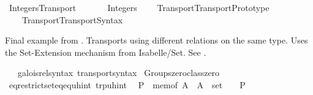 %
\begin{isabellebody}%
%
%
\isadelimdocument
%
\endisadelimdocument
%
\isatagdocument
%
\isamarkuptrue%
%
\endisatagdocument
{\isafolddocument}%
%
\isadelimdocument
%
\endisadelimdocument
%
\isadelimtheory
%
\endisadelimtheory
%
\isatagtheory
{}\isamarkupfalse%
\ Integers{\isacharunderscore}{\kern0pt}Transport\isanewline
\ \ \isanewline
\ \ \ \ Integers\isanewline
\ \ \ \ Transport{\isachardot}{\kern0pt}Transport{\isacharunderscore}{\kern0pt}Prototype\isanewline
\ \ \ \ Transport{\isachardot}{\kern0pt}Transport{\isacharunderscore}{\kern0pt}Syntax\isanewline
{}%
\endisatagtheory
{\isafoldtheory}%
%
\isadelimtheory
%
\endisadelimtheory
%
\isadelimdocument
%
\endisadelimdocument
%
\isatagdocument
%
\isamarkuptrue%
%
\endisatagdocument
{\isafolddocument}%
%
\isadelimdocument
%
\endisadelimdocument
%
\begin{isamarkuptext}%
Final example from \cite{transport}. Transports using different
relations on the same type. Uses the Set-Extension mechanism from Isabelle/Set.
See .%
\end{isamarkuptext}\isamarkuptrue%
\isamarkupfalse%
\isanewline
\ \ \ galois{\isacharunderscore}{\kern0pt}rel{\isacharunderscore}{\kern0pt}syntax\ transport{\isacharunderscore}{\kern0pt}syntax\isanewline
{}\isanewline
\isanewline
{}\isamarkupfalse%
\ Groups{\isachardot}{\kern0pt}zero{\isacharunderscore}{\kern0pt}class{\isachardot}{\kern0pt}zero\ {\isacharparenleft}{\kern0pt}{\isachardoublequoteopen}{}{\isachardoublequoteclose}{\isacharparenright}{\kern0pt}\isanewline
\isanewline
{}\isamarkupfalse%
\ eq{\isacharunderscore}{\kern0pt}restrict{\isacharunderscore}{\kern0pt}set{\isacharunderscore}{\kern0pt}eq{\isacharunderscore}{\kern0pt}eq{\isacharunderscore}{\kern0pt}uhint\ {\isacharbrackleft}{\kern0pt}trp{\isacharunderscore}{\kern0pt}uhint{\isacharbrackright}{\kern0pt}{\isacharcolon}{\kern0pt}\isanewline
\ \ {\isachardoublequoteopen}P\ {\isasymequiv}\ mem{\isacharunderscore}{\kern0pt}of\ A\ {\isasymLongrightarrow}\ {\isacharparenleft}{\kern0pt}{\isacharparenleft}{\kern0pt}{\isacharequal}{\kern0pt}\isactrlbsub A\isactrlesub {\isacharparenright}{\kern0pt}\ {\isacharcolon}{\kern0pt}{\isacharcolon}{\kern0pt}\ set\ {\isasymRightarrow}\ {\isacharunderscore}{\kern0pt}{\isacharparenright}{\kern0pt}\ {\isasymequiv}\ {\isacharparenleft}{\kern0pt}{\isacharequal}{\kern0pt}\isactrlbsub P\isactrlesub {\isacharparenright}{\kern0pt}{\isachardoublequoteclose}\isanewline

\end{isabellebody}
